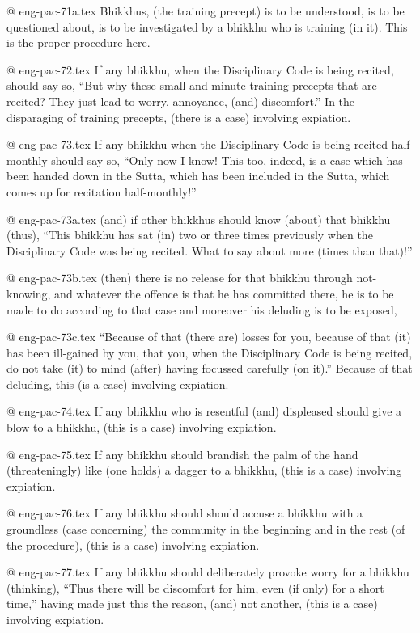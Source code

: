 @ eng-pac-71a.tex
Bhikkhus, (the training precept) is to be understood, is to be questioned about, is to be investigated by a bhikkhu who is training (in it). This is the proper procedure here.

@ eng-pac-72.tex
If any bhikkhu, when the Disciplinary Code is being recited, should say so, “But why these small and minute training precepts that are recited? They just lead to worry, annoyance, (and) discomfort.” In the disparaging of training precepts, (there is a case) involving expiation.

@ eng-pac-73.tex
If any bhikkhu when the Disciplinary Code is being recited half-monthly should say so, “Only now I know! This too, indeed, is a case which has been handed down in the Sutta, which has been included in the Sutta, which comes up for recitation half-monthly!”

@ eng-pac-73a.tex
(and) if other bhikkhus should know (about) that bhikkhu (thus), “This bhikkhu has sat (in) two or three times previously when the Disciplinary Code was being recited. What to say about more (times than that)!”

@ eng-pac-73b.tex
(then) there is no release for that bhikkhu through not-knowing, and whatever the offence is that he has committed there, he is to be made to do according to that case and moreover his deluding is to be exposed,

@ eng-pac-73c.tex
“Because of that (there are) losses for you, because of that (it) has been ill-gained by you, that you, when the Disciplinary Code is being recited, do not take (it) to mind (after) having focussed carefully (on it).” Because of that deluding, this (is a case) involving expiation.

@ eng-pac-74.tex
If any bhikkhu who is resentful (and) displeased should give a blow to a bhikkhu, (this is a case) involving expiation.

@ eng-pac-75.tex
If any bhikkhu should brandish the palm of the hand (threateningly) like (one holds) a dagger to a bhikkhu, (this is a case) involving expiation.

@ eng-pac-76.tex
If any bhikkhu should should accuse a bhikkhu with a groundless (case concerning) the community in the beginning and in the rest (of the procedure), (this is a case) involving expiation.

@ eng-pac-77.tex
If any bhikkhu should deliberately provoke worry for a bhikkhu (thinking), “Thus there will be discomfort for him, even (if only) for a short time,” having made just this the reason, (and) not another, (this is a case) involving expiation.

